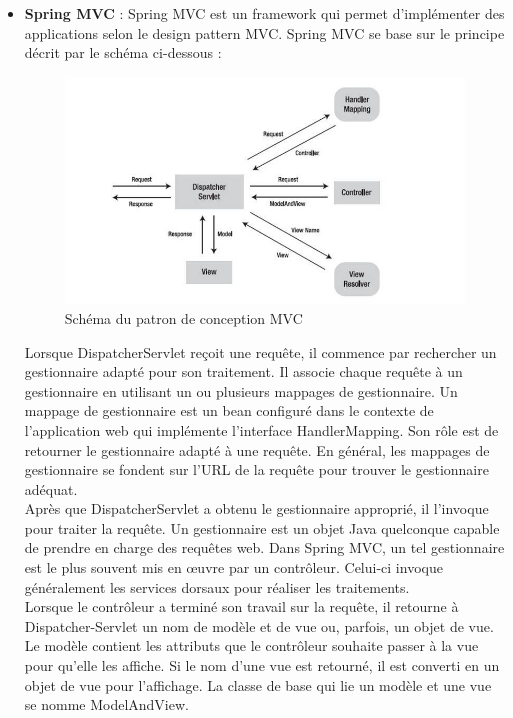 \documentclass[12pt]{article}
\begin{document}
\begin{itemize}
	\item \textbf{Spring MVC} : Spring MVC est un framework qui permet d’implémenter des applications selon le design pattern MVC. Spring MVC se base sur le principe décrit par le schéma ci-dessous :\newline
	

\begin{figure}[H]
	\centering
 		\includegraphics[width=1\textwidth]{diagrammes/mvc2.jpg} 
  		\caption{Schéma du patron de conception MVC}
	\end{figure}
	

Lorsque DispatcherServlet reçoit une requête, il commence par rechercher un gestionnaire adapté pour son traitement. Il associe chaque requête à un gestionnaire en utilisant un ou plusieurs mappages de gestionnaire. Un mappage de gestionnaire est un bean configuré dans le contexte de l’application web qui implémente l’interface HandlerMapping. Son rôle est de retourner le gestionnaire adapté à une requête. En général, les mappages de gestionnaire se fondent sur l’URL de la requête pour trouver le gestionnaire adéquat.\\
	

Après que DispatcherServlet a obtenu le gestionnaire approprié, il l’invoque pour traiter la requête. Un gestionnaire est un objet Java quelconque capable de prendre en charge des requêtes web. Dans Spring MVC, un tel gestionnaire est le plus souvent mis en œuvre par un contrôleur. Celui-ci invoque généralement les services dorsaux pour
réaliser les traitements.\\


Lorsque le contrôleur a terminé son travail sur la requête, il retourne à Dispatcher-Servlet un nom de modèle et de vue ou, parfois, un objet de vue. Le modèle contient les attributs que le contrôleur souhaite passer à la vue pour qu’elle les affiche. Si le nom d’une vue est retourné, il est converti en un objet de vue pour l’affichage. La classe de base qui lie un modèle et une vue se nomme ModelAndView.\\
	


\end{itemize}
\end{document}
